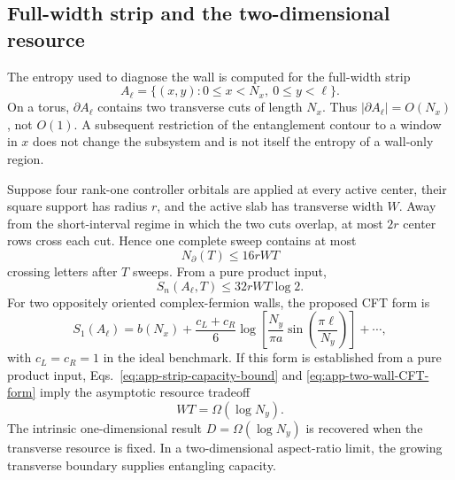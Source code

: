 \subsection{Full-width strip and the two-dimensional resource}

The entropy used to diagnose the wall is computed for the full-width strip
\begin{equation}
    A_\ell=\{(x,y):0\le x<N_x,\ 0\le y<\ell\}.
    \label{eq:app-full-width-strip}
\end{equation}
On a torus, \(\partial A_\ell\) contains two transverse cuts of length
\(N_x\).  Thus \(|\partial A_\ell|=O(N_x)\), not \(O(1)\).  A subsequent
restriction of the entanglement contour to a window in \(x\) does not change
the subsystem and is not itself the entropy of a wall-only region.

Suppose four rank-one controller orbitals are applied at every active center,
their square support has radius \(r\), and the active slab has transverse
width \(W\).  Away from the short-interval regime in which the two cuts
overlap, at most \(2r\) center rows cross each cut.  Hence one complete sweep
contains at most
\begin{equation}
    N_\partial(T)\le16rWT
    \label{eq:app-crossing-event-count}
\end{equation}
crossing letters after \(T\) sweeps.  From a pure product input,
\begin{equation}
    S_n(A_\ell,T)\le32rWT\log2.
    \label{eq:app-strip-capacity-bound}
\end{equation}
For two oppositely oriented complex-fermion walls, the proposed CFT form is
\begin{equation}
    S_1(A_\ell)
    =b(N_x)+\frac{c_L+c_R}{6}
      \log\!\left[
      \frac{N_y}{\pi a}\sin\!\left(\frac{\pi\ell}{N_y}\right)
      \right]+\cdots ,
    \label{eq:app-two-wall-CFT-form}
\end{equation}
with \(c_L=c_R=1\) in the ideal benchmark.  If this form is established
from a pure product input, Eqs.~\eqref{eq:app-strip-capacity-bound} and
\eqref{eq:app-two-wall-CFT-form} imply the asymptotic resource tradeoff
\begin{equation}
    WT=\Omega(\log N_y).
    \label{eq:app-width-time-tradeoff}
\end{equation}
The intrinsic one-dimensional result \(D=\Omega(\log N_y)\) is recovered
when the transverse resource is fixed.  In a two-dimensional aspect-ratio
limit, the growing transverse boundary supplies entangling capacity.

